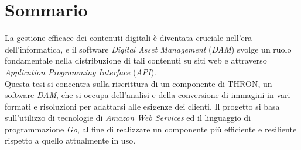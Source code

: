 \cleardoublepage
{}
{}
\begingroup
\let\clearpage\relax
\let\cleardoublepage\relax
\let\cleardoublepage\relax

\chapter*{Sommario}

La gestione efficace dei contenuti digitali è diventata cruciale nell'era dell'informatica, e il software \textit{Digital Asset Management} (\textit{DAM}) svolge un ruolo
fondamentale nella distribuzione di tali contenuti su siti web e attraverso
\textit{Application Programming Interface} (\textit{API}). \\
Questa tesi si concentra sulla riscrittura di un componente di THRON, un
software \textit{DAM}, che si occupa dell'analisi e della conversione di immagini in vari
formati e risoluzioni per adattarsi alle esigenze dei clienti.
Il progetto si basa sull'utilizzo di tecnologie di \textit{Amazon Web Services} ed il
linguaggio di programmazione \textit{Go},
al fine di realizzare un componente più efficiente e resiliente rispetto a quello attualmente in uso.



\endgroup

\vfill
